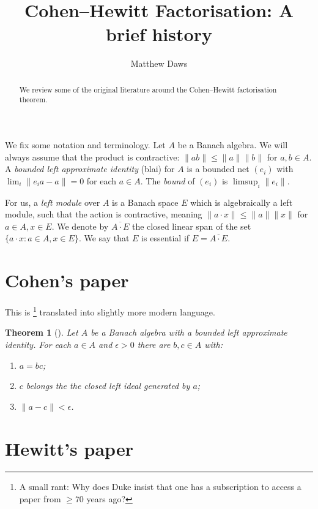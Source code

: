 \documentclass[a4paper,11pt]{article}
\newtheorem{theorem}[lemma]{Theorem}
\theoremstyle{definition}
\begin{document}
\title{Cohen--Hewitt Factorisation: A brief history}
\author{Matthew Daws}
\maketitle

\begin{abstract}
We review some of the original literature around the Cohen--Hewitt factorisation theorem.
\end{abstract}

We fix some notation and terminology.  Let $A$ be a Banach algebra.  We will always assume that
the product is contractive: $\|ab\| \leq \|a\| \|b\|$ for $a,b \in A$.  A \emph{bounded left
approximate identity} (blai) for $A$ is a bounded net $(e_i)$ with $\lim_i \|e_ia - a\|=0$ for
each $a\in A$.  The \emph{bound} of $(e_i)$ is $\limsup_i \|e_i\|$.

For us, a \emph{left module} over $A$ is a Banach space $E$ which is algebraically a left
module, such that the action is contractive, meaning $\|a\cdot x\| \leq \|a\| \|x\|$ for
$a\in A, x\in E$.  We denote by $\overline{A\cdot E}$ the closed linear span of the set
$\{ a\cdot x : a\in A, x\in E \}$.  We say that $E$ is essential if $E = \overline{A\cdot E}$.


\section{Cohen's paper}

This is \cite{cohen}\footnote{A small rant: Why does Duke insist that one has a subscription to
access a paper from $\geq70$ years ago?} translated into slightly more modern language.

\begin{theorem}[{\cite[Theorem~1]{cohen}}]
Let $A$ be a Banach algebra with a bounded left approximate identity.  For each $a\in A$ and
$\epsilon>0$ there are $b,c\in A$ with:
\begin{enumerate}
\item $a=bc$;
\item $c$ belongs the the closed left ideal generated by $a$;
\item $\|a-c\| < \epsilon$.
\end{enumerate}
\end{theorem}



\section{Hewitt's paper}
\end{document}
